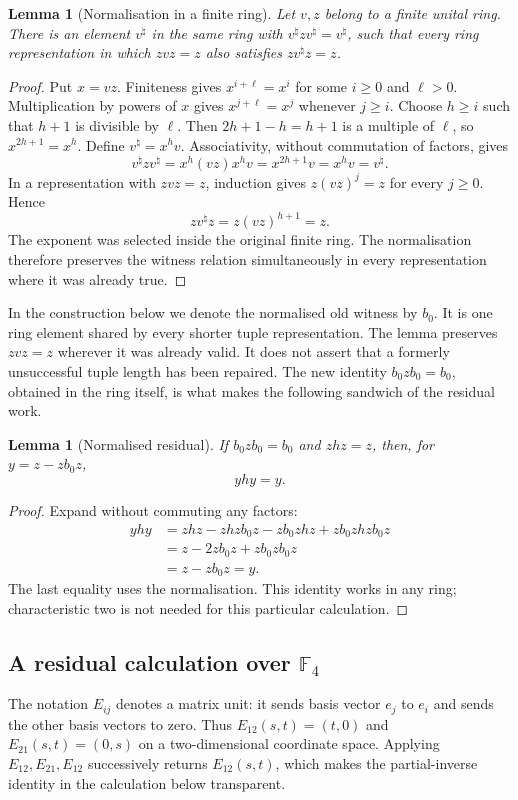 \documentclass[11pt,a4paper,oneside,openany]{book}
\newtheorem{lemma}[theorem]{Lemma}
\theoremstyle{definition}\newtheorem{definition}[theorem]{Definition}
\theoremstyle{remark}\newtheorem{remark}[theorem]{Remark}
\numberwithin{equation}{chapter}
\begin{document}
\begin{lemma}[Normalisation in a finite ring]\label{tx:lem:normal}
Let $v,z$ belong to a finite unital ring. There is an element
$v^\natural$ in the same ring with
$v^\natural z v^\natural=v^\natural$, such that every ring
representation in which $zvz=z$ also satisfies
$zv^\natural z=z$.
\end{lemma}
\begin{proof}
Put $x=vz$. Finiteness gives $x^{i+\ell}=x^i$ for some $i\ge0$
and $\ell>0$. Multiplication by powers of $x$ gives
$x^{j+\ell}=x^j$ whenever $j\ge i$. Choose $h\ge i$ such that
$h+1$ is divisible by $\ell$. Then $2h+1-h=h+1$ is a multiple
of $\ell$, so $x^{2h+1}=x^h$. Define $v^\natural=x^hv$.
Associativity, without commutation of factors, gives
\[
 v^\natural z v^\natural
      =x^h(vz)x^hv=x^{2h+1}v=x^hv=v^\natural.
\]
In a representation with $zvz=z$, induction gives
$z(vz)^j=z$ for every $j\ge0$. Hence
\[
                     zv^\natural z=z(vz)^{h+1}=z.
\]
The exponent was selected inside the original finite ring. The
normalisation therefore preserves the witness relation simultaneously
in every representation where it was already true.
\end{proof}
In the construction below we denote the normalised old witness by $b_0$. It is one ring element shared by every shorter tuple representation.
The lemma preserves $zvz=z$ wherever it was already valid. It does
not assert that a formerly unsuccessful tuple length has been repaired.
The new identity $b_0zb_0=b_0$, obtained in the ring itself, is what
makes the following sandwich of the residual work.

\begin{lemma}[Normalised residual]\label{tx:lem:residual}
If $b_0zb_0=b_0$ and $zhz=z$, then, for $y=z-zb_0z$,
\[yhy=y.\]
\end{lemma}
\begin{proof}
Expand without commuting any factors:
\begin{align*}
yhy&=zhz-zhzb_0z-zb_0zhz+zb_0zhzb_0z\\
&=z-2zb_0z+zb_0zb_0z\\
&=z-zb_0z=y.
\end{align*}
The last equality uses the normalisation. This identity works in any ring; characteristic two is not needed for this particular calculation.
\end{proof}

\subsection{A residual calculation over \texorpdfstring{$\mathbb F_4$}{F4}}
The notation $E_{ij}$ denotes a matrix unit: it sends basis vector
$e_j$ to $e_i$ and sends the other basis vectors to zero. Thus
$E_{12}(s,t)=(t,0)$ and $E_{21}(s,t)=(0,s)$ on a two-dimensional
coordinate space. Applying $E_{12},E_{21},E_{12}$ successively
returns $E_{12}(s,t)$, which makes the partial-inverse identity
in the calculation below transparent.
\end{document}
